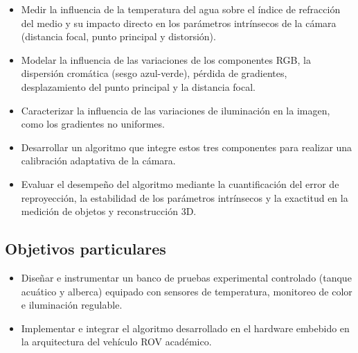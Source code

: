 \documentclass[12pt,letterpaper,spanish,twoside,openright]{report}
\begin{document}
\begin{itemize}[noitemsep]
    \item Medir la influencia de la temperatura del agua sobre el índice de refracción del medio y su impacto directo en los parámetros intrínsecos de la cámara (distancia focal, punto principal y distorsión).
    \item Modelar la influencia de las variaciones de los componentes RGB, la dispersión cromática (sesgo azul-verde), pérdida de gradientes, desplazamiento del punto principal y la distancia focal.
    \item Caracterizar la influencia de las variaciones de iluminación en la imagen, como los gradientes no uniformes.
    \item Desarrollar un algoritmo que integre estos tres componentes para realizar una calibración adaptativa de la cámara.
    \item Evaluar el desempeño del algoritmo mediante la cuantificación del error de reproyección, la estabilidad de los parámetros intrínsecos y la exactitud en la medición de objetos y reconstrucción 3D.
\end{itemize}

\subsection{Objetivos particulares}

\begin{itemize}[noitemsep]
    \item Diseñar e instrumentar un banco de pruebas experimental controlado (tanque acuático y alberca) equipado con sensores de temperatura, monitoreo de color e iluminación regulable.
    \item Implementar e integrar el algoritmo desarrollado en el hardware embebido en la arquitectura del vehículo ROV académico.
\end{itemize}
\end{document}
